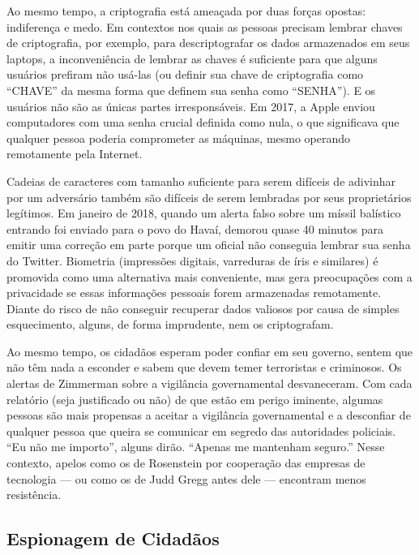 \documentclass{book}
\begin{document}
Ao mesmo tempo, a criptografia está ameaçada por duas forças opostas: indiferença e medo. Em contextos nos quais as pessoas precisam lembrar chaves de criptografia, por exemplo, para descriptografar os dados armazenados em seus laptops, a inconveniência de lembrar as chaves é suficiente para que alguns usuários prefiram não usá-las (ou definir sua chave de criptografia como ``CHAVE'' da mesma forma que definem sua senha como ``SENHA''). E os usuários não são as únicas partes irresponsáveis. Em 2017, a Apple enviou computadores com uma senha crucial definida como nula, o que significava que qualquer pessoa poderia comprometer as máquinas, mesmo operando remotamente pela Internet.

Cadeias de caracteres com tamanho suficiente para serem difíceis de adivinhar por um adversário também são difíceis de serem lembradas por seus proprietários legítimos. Em janeiro de 2018, quando um alerta falso sobre um míssil balístico entrando foi enviado para o povo do Havaí, demorou quase 40 minutos para emitir uma correção em parte porque um oficial não conseguia lembrar sua senha do Twitter. Biometria (impressões digitais, varreduras de íris e similares) é promovida como uma alternativa mais conveniente, mas gera preocupações com a privacidade se essas informações pessoais forem armazenadas remotamente. Diante do risco de não conseguir recuperar dados valiosos por causa de simples esquecimento, alguns, de forma imprudente, nem os criptografam.

Ao mesmo tempo, os cidadãos esperam poder confiar em seu governo, sentem que não têm nada a esconder e sabem que devem temer terroristas e criminosos. Os alertas de Zimmerman sobre a vigilância governamental desvaneceram. Com cada relatório (seja justificado ou não) de que estão em perigo iminente, algumas pessoas são mais propensas a aceitar a vigilância governamental e a desconfiar de qualquer pessoa que queira se comunicar em segredo das autoridades policiais. ``Eu não me importo'', alguns dirão. ``Apenas me mantenham seguro.'' Nesse contexto, apelos como os de Rosenstein por cooperação das empresas de tecnologia --- ou como os de Judd Gregg antes dele --- encontram menos resistência.

\subsection{Espionagem de Cidadãos}
\label{segredos:espionagem-cidadaos}
\end{document}
